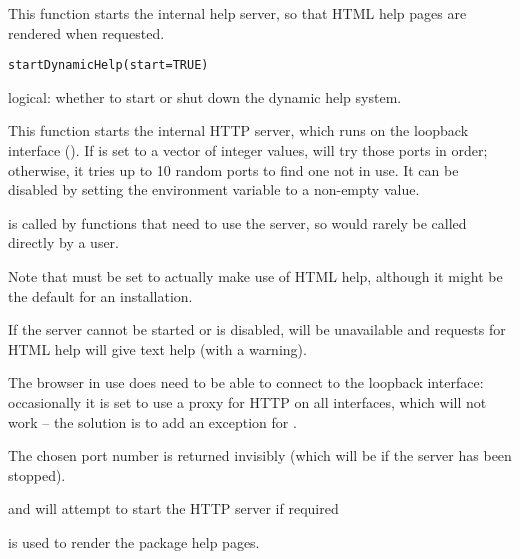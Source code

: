 %
\begin{Description}\relax
This function starts the internal help server, so that HTML help pages
are rendered when requested.
\end{Description}
%
\begin{Usage}
\begin{verbatim}
startDynamicHelp(start=TRUE)
\end{verbatim}
\end{Usage}
%
\begin{Arguments}
\begin{ldescription}
\item[\code{start}] logical: whether to start or shut down the dynamic help
system.
\end{ldescription}
\end{Arguments}
%
\begin{Details}\relax
This function starts the internal HTTP server, which runs on the
loopback interface ().  If 
is set to a vector of integer values,  will try
those ports in order; otherwise, it tries up to 10 random ports to
find one not in use.  It can be disabled by setting the environment
variable  to a non-empty value.

 is called by functions that need to use the
server, so would rarely be called directly by a user.

Note that  must be set to actually make use
of HTML help, although it might be the default for an \R{} installation.

If the server cannot be started or is disabled,
 will be unavailable and requests for HTML
help will give text help (with a warning).

The browser in use does need to be able to connect to the loopback
interface: occasionally it is set to use a proxy for HTTP on all
interfaces, which will not work -- the solution is to add an exception
for .
\end{Details}
%
\begin{Value}
The chosen port number is returned invisibly (which will be 
if the server has been stopped).
\end{Value}
%
\begin{SeeAlso}\relax
{} and 
will attempt to start the HTTP server if required

 is used to render the package help pages.
\end{SeeAlso}
